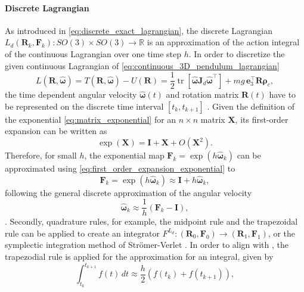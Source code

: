 \paragraph{Discrete Lagrangian}

As introduced in \eqref{eq:discrete_exact_lagrangian}, the discrete Lagrangian $L_d(\bm{R}_k, \bm{F}_k):SO(3) \times SO(3) \to \mathbb{R} $ is an approximation of the action integral of the continuous Lagrangian over one time step $h$. In order to discretize the given continuous Lagrangian of \eqref{eq:continuous_3D_pendulum_lagrangian}
\begin{equation}\label{eq:discrete_3D_pendulum_lagrangian}
    L(\bm{R}, \hat{\bm{\omega}}) = T(\bm{R}, \hat{\bm{\omega}}) - U(\bm{R})
    = \frac{1}{2}\operatorname{tr}[\hat{\bm{\omega}} \bm{J}_d \hat{\bm{\omega}}^\top] + mg\, \bm{e}_3^\top \bm{R}\bm{\rho}_c,
\end{equation}
the time dependent angular velocity $\hat{\bm{\omega}}(t)$ and rotation matrix $\bm{R}(t)$ have to be represented on the discrete time interval $[t_k,t_{k+1}]$ \cite{Marsden2001}. Given the definition of the exponential \eqref{eq:matrix_exponential} for an $n\times n$ matrix $\bm{X}$,
its first-order expansion can be written as
\begin{equation}\label{eq:first_order_expansion_exponential}
    \exp(\bm{X}) = \bm{I} + \bm{X} + O(\bm{X}^2).
\end{equation}
Therefore, for small $h$, the exponential map $\bm{F}_k = \exp(h \hat{\bm{\omega}}_k)$ can be approximated using \eqref{eq:first_order_expansion_exponential} to
\[
    \bm{F}_k = \exp(h \hat{\bm{\omega}}_k) \approx \bm{I} + h \hat{\bm{\omega}}_k,
\]
following the general discrete approximation of the angular velocity
\begin{equation}\label{eq:discrete_velocity_approximation}
    \hat{\bm{\omega}}_k \approx \frac{1}{h}(\bm{F}_k - \bm{I}),
\end{equation}
\cite{Lee2008}. Secondly, quadrature rules, for example, the midpoint rule and the trapezoidal rule can be applied to create an integrator $F^{L_{d}}: (\bm{R}_0, \bm{F}_0) \to (\bm{R}_1, \bm{F}_1)$, or the symplectic integration method of Str\"{o}mer-Verlet \cite{Marsden2001}. In order to align with \cite{Lee2008}, the trapezodial rule is applied for the approximation for an integral, given by
\begin{equation}\label{eq:trapezodial_rule}
    \int_{t_k}^{t_{k+1}} f(t)\,dt
    \approx
    \frac{h}{2}\left(f(t_k)+f(t_{k+1})\right),
\end{equation}
